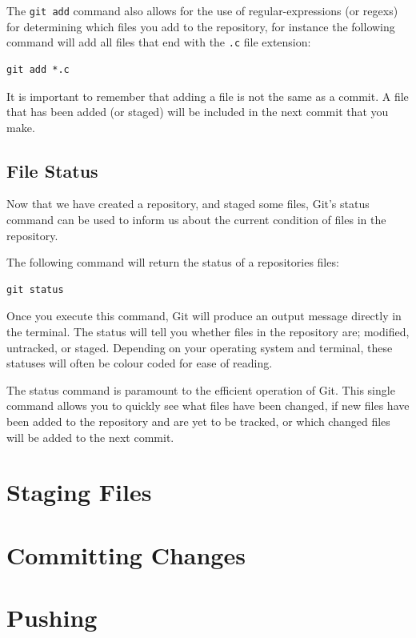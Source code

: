 \documentclass[11pt, a4paper, titlepage]{article}
\begin{document}
The {\tt git add} command also allows for the use of regular-expressions (or
regexs) for determining which files you add to the repository, for instance the
following command will add all files that end with the {\tt .c} file
extension:

\begin{lstlisting}[label=lst_add_regex,
caption=Adding all files ending with .c file etension.]
 git add *.c
\end{lstlisting}
It is important to remember that adding a file is not the same as a commit.
A file that has been added (or staged) will be included in the next commit
that you make.


\subsection{File Status}
Now that we have created a repository, and staged some files, Git's status
command can be used to inform us about the current condition of files in the
repository.  

The following command will return the status of a repositories files:
\begin{lstlisting}[label=lst_status,
caption=Initialisin a new Git repository]
 git status
\end{lstlisting}
Once you execute this command, Git will produce an output message directly in
the terminal.
The status will tell you whether files in the repository are; modified,
untracked, or staged.
Depending on your operating system and terminal, these statuses will often be
colour coded for ease of reading.


The status command is paramount to the efficient operation of Git.
This single command allows you to quickly see what files have been changed, if
new files have been added to the repository and are yet to be tracked, or which
changed files will be added to the next commit.


\section{Staging Files}



\section{Committing Changes}



\section{Pushing}
\end{document}

